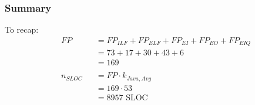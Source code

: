 \subsubsection{Summary}
To recap:
\begin{equation*}
	\begin{aligned}
		&	FP
		& & = FP_{ILF} + FP_{ELF} + FP_{EI} + FP_{EO} + FP_{EIQ}\\
		&&& = 73 + 17 + 30 + 43 + 6\\
		&&& = 169\\	
		\\
		&   n_{SLOC}
		& & = FP \cdot k_{Java, Avg}\\
		&&& = 169 \cdot 53\\
		&&& = 8957 \text{ SLOC}
	\end{aligned}
\end{equation*}
%

